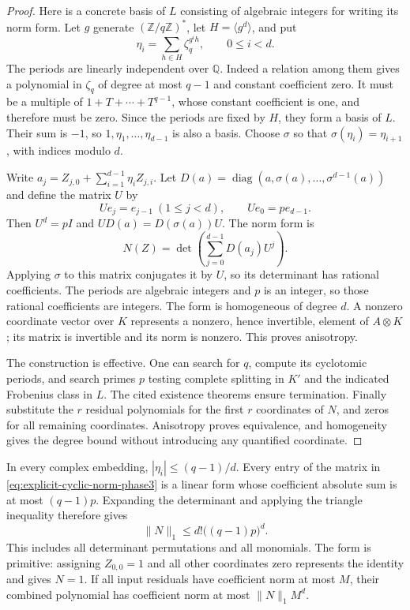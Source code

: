 \begin{proof}
Here is a concrete basis of $L$ consisting of algebraic integers
for writing its norm form.
Let $g$ generate $(\mathbb Z/q\mathbb Z)^*$, let
$H=\langle g^d\rangle$, and put
\[
 \eta_i=\sum_{h\in H}\zeta_q^{g^ih},\qquad 0\le i<d.
\]
The periods are linearly independent over $\mathbb Q$.
Indeed a relation among them gives a polynomial in $\zeta_q$
of degree at most $q-1$ and constant coefficient zero.
It must be a multiple of $1+T+\cdots+T^{q-1}$, whose constant
coefficient is one, and therefore must be zero.  Since the
periods are fixed by $H$, they form a basis of $L$.  Their sum
is $-1$, so $1,\eta_1,\ldots,\eta_{d-1}$ is also a basis.
Choose
$\sigma$ so that $\sigma(\eta_i)=\eta_{i+1}$, with indices
modulo $d$.

Write $a_j=Z_{j,0}+\sum_{i=1}^{d-1}\eta_i Z_{j,i}$.  Let
$D(a)=\operatorname{diag}(a,\sigma(a),\ldots,\sigma^{d-1}(a))$
and define the matrix $U$ by
\[
 Ue_j=e_{j-1}\ (1\le j<d),\qquad Ue_0=p e_{d-1}.
\]
Then $U^d=pI$ and $UD(a)=D(\sigma(a))U$.  The norm form is
\begin{equation}\label{eq:explicit-cyclic-norm-phase3}
 N(Z)=\det\left(\sum_{j=0}^{d-1}D(a_j)U^j\right).
\end{equation}
Applying $\sigma$ to this matrix conjugates it by $U$, so
its determinant has rational coefficients.  The periods are
algebraic integers and $p$ is an integer, so those rational
coefficients are integers.  The form is homogeneous of degree
$d$.  A nonzero coordinate vector over $K$ represents a
nonzero, hence invertible, element of $A\otimes K$; its matrix
is invertible and its norm is nonzero.  This proves anisotropy.

The construction is effective.  One can search for $q$, compute
its cyclotomic periods, and search primes $p$ testing complete
splitting in $K'$ and the indicated Frobenius class in $L$.
The cited existence theorems ensure termination.  Finally
substitute the $r$ residual polynomials for the first $r$
coordinates of $N$, and zeros for all remaining coordinates.
Anisotropy proves equivalence, and homogeneity gives the degree
bound without introducing any quantified coordinate.
\end{proof}

\begin{remark}
In every complex embedding, $|\eta_i|\le(q-1)/d$.
Every entry of the matrix in
\eqref{eq:explicit-cyclic-norm-phase3} is a linear form whose
coefficient absolute sum is at most $(q-1)p$.  Expanding the
determinant and applying the triangle inequality therefore gives
\[
                       \|N\|_1\le d!\bigl((q-1)p\bigr)^d.
\]
This includes all determinant permutations and all monomials.
The form is primitive: assigning $Z_{0,0}=1$ and all other
coordinates zero represents the identity and gives $N=1$.
If all input residuals have
coefficient norm at most $M$, their combined polynomial has
coefficient norm at most $\|N\|_1M^d$.
\end{remark}

